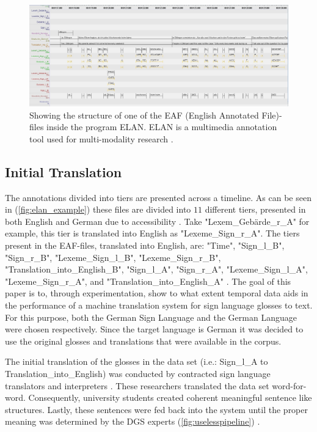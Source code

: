 \begin{figure}[h]
\caption{Showing the structure of one of the EAF (English Annotated File)-files \cite{elan_example} inside the program ELAN. ELAN is a multimedia annotation tool used for multi-modality research \cite{sloetjes2017elan}. }
 \centering 
 \includegraphics[width=14cm]{Bachelor CSAI thesis template/images/ELAN_example.jpg}
 
 \label{fig:elan_example}
\end{figure}

\subsection{Initial Translation}

The annotations divided into tiers are presented across a timeline. As can be seen in (\autoref{fig:elan_example}) these files are divided into $11$ different tiers, presented in both English and German due to accessibility \cite{konradoffentliches}. Take "Lexem\_Gebärde\_r\_A" for example, this tier is translated into English as "Lexeme\_Sign\_r\_A". The tiers present in the EAF-files, translated into English, are: "Time", "Sign\_l\_B", "Sign\_r\_B", "Lexeme\_Sign\_l\_B", "Lexeme\_Sign\_r\_B", 
"Translation\_into\_English\_B", "Sign\_l\_A", "Sign\_r\_A", "Lexeme\_Sign\_l\_A", "Lexeme\_Sign\_r\_A", and "Translation\_into\_English\_A" \cite{sloetjes2017elan}. The goal of this paper is to, through experimentation, show to what extent temporal data aids in the performance of a machine translation system for sign language glosses to text. For this purpose, both the German Sign Language and the German Language were chosen respectively. Since the target language is German it was decided to use the original glosses and translations that were available in the corpus.

The initial translation of the glosses in the data set (i.e.: Sign\_l\_A to Translation\_into\_English) was conducted by contracted sign language translators and interpreters \cite{konradoffentliches}. These researchers translated the data set word-for-word. Consequently, university students created coherent meaningful sentence like structures. Lastly, these sentences were fed back into the system until the proper meaning was determined by the DGS experts (\autoref{fig:uselesspipeline}) \cite{konradoffentliches}.

